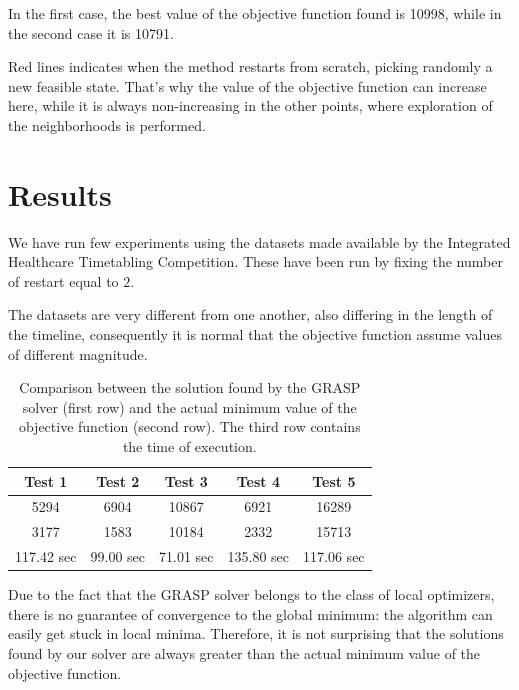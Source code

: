 \documentclass{article}
\begin{document}
In the first case, the best value of the objective function found is 10998, while in the second case it is 10791.

Red lines indicates when the method restarts from scratch, picking randomly a new feasible state. That's why the 
value of the objective function can increase here, while it is always non-increasing in the other points, where exploration of the 
neighborhoods is performed.

\section{Results}
We have run few experiments using the datasets made available by the Integrated Healthcare Timetabling Competition. 
These have been run by fixing the number of restart equal to $2$.

The datasets are very different from one another, also differing in the length of the timeline, consequently it is normal that the objective function assume values of different magnitude.

\begin{table}[h!]
    \centering
    \begin{tabular}{|c|c|c|c|c|}
        \hline
        \textbf{Test 1} & \textbf{Test 2} & \textbf{Test 3} & \textbf{Test 4} & \textbf{Test 5}  \\ \hline
        5294 & 6904 & 10867 & 6921 & 16289   \\ \hline
        3177 & 1583 & 10184 & 2332 & 15713  \\ \hline
        117.42 sec & 99.00 sec & 71.01 sec & 135.80 sec & 117.06 sec \\ \hline
    \end{tabular}
    \caption{Comparison between the solution found by the GRASP solver (first row) and the actual minimum value of the objective function (second row). The third row contains the time of execution.}
    \label{table:risultati}
\end{table}

Due to the fact that the GRASP solver belongs to the class of local optimizers, there is no guarantee of convergence to the global minimum: the algorithm can easily get stuck in local minima. Therefore, it is not surprising that the solutions found by our solver are always greater than the actual minimum value of the objective function.
\end{document}
